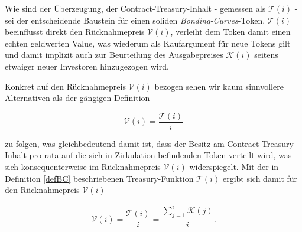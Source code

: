 \begin{Fazit}

Wie sind der Überzeugung, der Contract-Treasury-Inhalt - gemessen als $\mathcal{T} \left( i \right)$ - sei der entscheidende Baustein für einen soliden \textit{Bonding-Curves}-Token. $\mathcal{T} \left( i \right)$ beeinflusst direkt den Rücknahmepreis $\mathcal{V} \left( i \right)$, verleiht dem Token damit einen echten geldwerten Value, was wiederum als Kaufargument für neue Tokens gilt und damit implizit auch zur Beurteilung des Ausgabepreises $\mathcal{K} \left( i \right)$ seitens etwaiger neuer Investoren hinzugezogen wird.

\vspace{0.2cm}

Konkret auf den Rücknahmepreis $\mathcal{V} \left( i \right)$ bezogen sehen wir kaum sinnvollere Alternativen als der gängigen Definition 

\begin{equation*}
\mathcal{V} \left( i \right) = \frac{\mathcal{T} \left( i \right)}{i}
\end{equation*}

zu folgen, was gleichbedeutend damit ist, dass der Besitz am Contract-Treasury-Inhalt pro rata auf die sich in Zirkulation befindenden Token verteilt wird, was sich konsequenterweise im Rücknahmepreis $\mathcal{V} \left( i \right)$ widerspiegelt. Mit der in Definition \ref{defBC} beschriebenen Treasury-Funktion $\mathcal{T} \left( i \right)$ ergibt sich damit für den Rücknahmepreis $\mathcal{V} \left( i \right)$

\begin{equation*}
\mathcal{V} \left( i \right) = \frac{\mathcal{T} \left( i \right)}{i} = \frac{\sum_{j = 1}^{i} \mathcal{K} \left( j \right)}{i}.
\end{equation*} 

\vspace{0.3cm}

\end{Fazit}

\newpage
